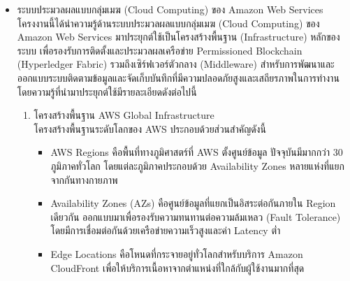 \begin{itemize}
    \item ระบบประมวลผลแบบกลุ่มเมฆ (Cloud Computing) ของ Amazon Web Services \\
    โครงงานนี้ได้นำความรู้ด้านระบบประมวลผลแบบกลุ่มเมฆ (Cloud Computing) ของ Amazon Web Services มาประยุกต์ใช้เป็นโครงสร้างพื้นฐาน (Infrastructure) หลักของระบบ เพื่อรองรับการติดตั้งและประมวลผลเครือข่าย Permissioned Blockchain (Hyperledger Fabric) รวมถึงเซิร์ฟเวอร์ตัวกลาง (Middleware) สำหรับการพัฒนาและออกแบบระบบติดตามข้อมูลและจัดเก็บบันทึกที่มีความปลอดภัยสูงและเสถียรภาพในการทำงาน โดยความรู้ที่นำมาประยุกต์ใช้มีรายละเอียดดังต่อไปนี้
    \begin{enumerate}
        \item โครงสร้างพื้นฐาน AWS Global Infrastructure \\
โครงสร้างพื้นฐานระดับโลกของ AWS ประกอบด้วยส่วนสำคัญดังนี้
\begin{itemize}
    \item AWS Regions คือพื้นที่ทางภูมิศาสตร์ที่ AWS ตั้งศูนย์ข้อมูล ปัจจุบันมีมากกว่า 30 ภูมิภาคทั่วโลก โดยแต่ละภูมิภาคประกอบด้วย Availability Zones หลายแห่งที่แยกจากกันทางกายภาพ
    \item Availability Zones (AZs) คือศูนย์ข้อมูลที่แยกเป็นอิสระต่อกันภายใน Region เดียวกัน ออกแบบมาเพื่อรองรับความทนทานต่อความล้มเหลว (Fault Tolerance) โดยมีการเชื่อมต่อกันด้วยเครือข่ายความเร็วสูงและค่า Latency ต่ำ
    \item Edge Locations คือโหนดที่กระจายอยู่ทั่วโลกสำหรับบริการ Amazon CloudFront เพื่อให้บริการเนื้อหาจากตำแหน่งที่ใกล้กับผู้ใช้งานมากที่สุด
\end{itemize}


\end{enumerate}
\end{itemize}
